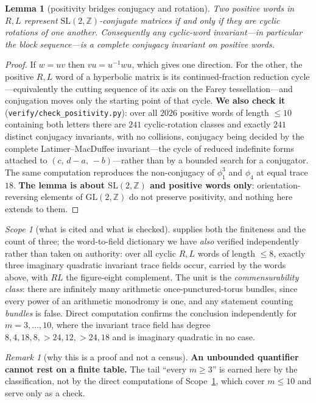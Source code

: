 \documentclass[11pt,reqno]{amsart}
\theoremstyle{plain}
\newtheorem{lemma}[theorem]{Lemma}
\theoremstyle{definition}
\theoremstyle{remark}
\newtheorem{scope}[theorem]{Scope}
\newtheorem{remark}[theorem]{Remark}
\newcommand{\Z}{\mathbb{Z}}
\newcommand{\SL}{\mathrm{SL}}
\newcommand{\GL}{\mathrm{GL}}
\newcommand{\fn}[1]{\texttt{\small #1}}
\begin{document}
\begin{lemma}[positivity bridges conjugacy and rotation]\label{lem:positivity}
Two positive words in $R,L$ represent $\SL(2,\Z)$-conjugate matrices if and only if they
are cyclic rotations of one another. Consequently any cyclic-word invariant---in
particular the block sequence---is a complete conjugacy invariant on positive words.
\end{lemma}

\begin{proof}
If $w=uv$ then $vu=u^{-1}wu$, which gives one direction. For the other, the positive
$R,L$ word of a hyperbolic matrix is its continued-fraction reduction cycle---equivalently
the cutting sequence of its axis on the Farey tessellation---and conjugation moves only
the starting point of that cycle. \textbf{We also check it}
(\fn{verify/check\_\allowbreak positivity.py}): over all $2026$ positive words of length
$\le10$ containing both letters there are $241$ cyclic-rotation classes and exactly $241$
distinct conjugacy invariants, with no collisions, conjugacy being decided by the complete
Latimer--MacDuffee invariant---the cycle of reduced indefinite forms attached to
$(c,\,d-a,\,-b)$---rather than by a bounded search for a conjugator. The same computation
reproduces the non-conjugacy of $\phi_1^{3}$ and $\phi_4$ at equal trace $18$.
\textbf{The lemma is about $\SL(2,\Z)$ and positive words only}: orientation-reversing
elements of $\GL(2,\Z)$ do not preserve positivity, and nothing here extends to them.
\end{proof}

\begin{scope}[what is cited and what is checked]\label{sc:bmr}
\cite{BMR} supplies both the finiteness and the count of three; the word-to-field
dictionary we have \emph{also} verified independently rather than taken on authority: over all cyclic $R,L$ words of length $\le8$,
exactly three imaginary quadratic invariant trace fields occur, carried by the words
above, with $RL$ the figure-eight complement. The unit is the \emph{commensurability
class}: there are infinitely many arithmetic once-punctured-torus bundles, since every
power of an arithmetic monodromy is one, and any statement counting \emph{bundles} is
false. Direct computation confirms the conclusion independently for $m=3,\dots,10$,
where the invariant trace field has degree $8,4,18,8,>24,12,>24,18$ and is imaginary
quadratic in no case.
\end{scope}

\begin{remark}[why this is a proof and not a census]
\textbf{An unbounded quantifier cannot rest on a finite table.} The tail
``every $m\ge3$'' is earned here by the classification, not by the direct computations of
Scope~\ref{sc:bmr}, which cover $m\le10$ and serve only as a check.
\end{remark}
\end{document}
